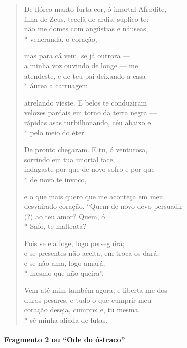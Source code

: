\begin{verse}
De flóreo manto furta-cor, ó imortal Afrodite,\\
filha de Zeus, tecelã de ardis, suplico-te:\\
não me domes com angústias e náuseas,\\*
veneranda, o coração,

mas para cá vem, se já outrora ---\\
a minha voz ouvindo de longe --- me\\
atendeste, e de teu pai deixando a casa\\*
áurea a carruagem

atrelando vieste. E belos te conduziram\\
velozes pardais em torno da terra negra ---\\
rápidas asas turbilhonando, céu abaixo e\\*
pelo meio do éter.

De pronto chegaram. E tu, ó venturosa,\\
sorrindo em tua imortal face,\\
indagaste por que de novo sofro e por que\\*
de novo te invoco,

e o que mais quero que me aconteça em meu\\
desvairado coração. “Quem de novo devo \qb{}persuadir\\
(?) ao teu amor? Quem, ó\\*
Safo, te maltrata?

Pois se ela foge, logo perseguirá;\\
e se presentes não aceita, em troca os dará;\\
e se não ama, logo amará,\\*
mesmo que não queira”.

Vem até mim também agora, e liberta-me dos\\
duros pesares, e tudo o que cumprir meu\\
coração deseja, cumpre; e, tu mesma,\\*
sê minha aliada de lutas.
\end{verse}

\paragraph{Fragmento 2 ou “Ode do óstraco”}

